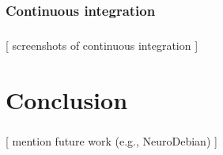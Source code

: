 \documentclass{beamer}
\begin{document}
\subsubsection{Continuous integration}
\begin{frame}\frametitle{\subsecname}
	[
		{screenshots of continuous integration}
	]
\end{frame}


\section{Conclusion}
\begin{frame}\frametitle{\secname}
	[
		mention future work (e.g., NeuroDebian)
	]
\end{frame}


\end{document}
